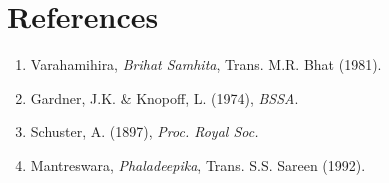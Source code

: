 \documentclass[
  11pt,
  a4paper,
  oneside,
  openany]{article}
\providecommand{\tightlist}{%
  \setlength{\itemsep}{0pt}\setlength{\parskip}{0pt}}\usepackage{longtable,booktabs,array}
\begin{document}
\section{References}\label{references}

\begin{enumerate}
\def\labelenumi{\arabic{enumi}.}
\tightlist
\item
  Varahamihira, \emph{Brihat Samhita}, Trans. M.R. Bhat (1981).
\item
  Gardner, J.K. \& Knopoff, L. (1974), \emph{BSSA}.
\item
  Schuster, A. (1897), \emph{Proc. Royal Soc.}
\item
  Mantreswara, \emph{Phaladeepika}, Trans. S.S. Sareen (1992).
\end{enumerate}
\end{document}
